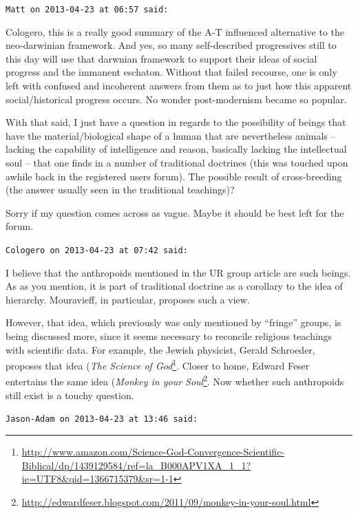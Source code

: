 \begin{footnotesize}
\begin{sffamily}
\texttt{Matt on 2013-04-23 at 06:57 said:}

Cologero, this is a really good summary of the A-T influenced alternative to the neo-darwinian framework. And yes, so many self-described progressives still to this day will use that darwnian framework to support their ideas of social progress and the immanent eschaton. Without that failed recourse, one is only left with confused and incoherent answers from them as to just how this apparent social/historical progress occurs. No wonder post-modernism became so popular.

With that said, I just have a question in regards to the possibility of beings that have the material/biological shape of a human that are nevertheless animals -- lacking the capability of intelligence and reason, basically lacking the intellectual soul -- that one finds in a number of traditional doctrines (this was touched upon awhile back in the registered users forum). The possible result of cross-breeding (the answer usually seen in the traditional teachings)?

Sorry if my question comes across as vague. Maybe it should be best left for the forum.

\hfill

\texttt{Cologero on 2013-04-23 at 07:42 said:}

I believe that the anthropoids mentioned in the UR group article are such beings. As as you mention, it is part of traditional doctrine as a corollary to the idea of hierarchy. Mouravieff, in particular, proposes such a view.

However, that idea, which previously was only mentioned by ``fringe'' groups, is being discussed more, since it seems necessary to reconcile religious teachings with scientific data. For example, the Jewish physicist, Gerald Schroeder, proposes that idea (\textit{The Science of God}\footnote{\url{http://www.amazon.com/Science-God-Convergence-Scientific-Biblical/dp/1439129584/ref=la_B000APV1XA_1_1?ie=UTF8\&qid=1366715379\&sr=1-1}}. Closer to home, Edward Feser entertains the same idea (\textit{Monkey in your Soul}\footnote{\url{http://edwardfeser.blogspot.com/2011/09/monkey-in-your-soul.html}}. Now whether such anthropoids still exist is a touchy question.

\hfill

\texttt{Jason-Adam on 2013-04-23 at 13:46 said:}


\end{sffamily}
\end{footnotesize}
